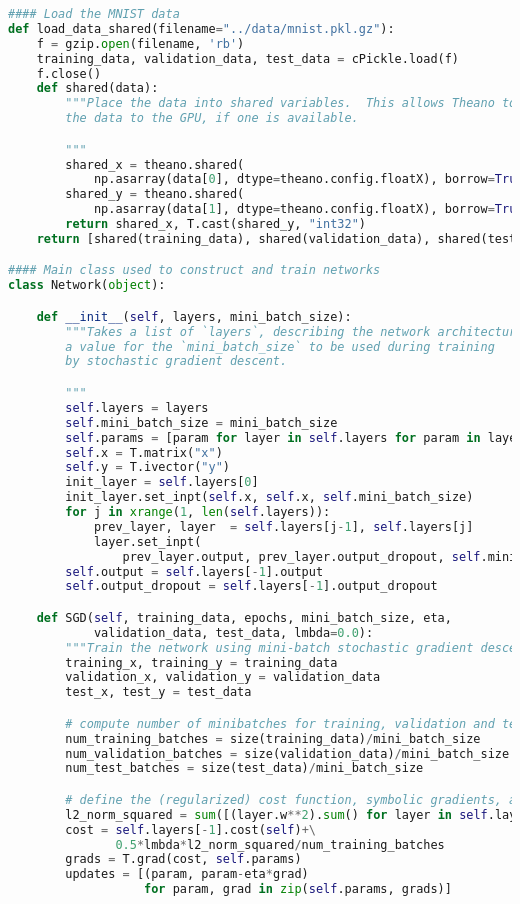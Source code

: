 \begin{fullwidth}
\begin{lstlisting}[caption={network3.py (Python 2.7)},label={lst:network3.py}, language=Python]
#### Load the MNIST data
def load_data_shared(filename="../data/mnist.pkl.gz"):
    f = gzip.open(filename, 'rb')
    training_data, validation_data, test_data = cPickle.load(f)
    f.close()
    def shared(data):
        """Place the data into shared variables.  This allows Theano to copy
        the data to the GPU, if one is available.

        """
        shared_x = theano.shared(
            np.asarray(data[0], dtype=theano.config.floatX), borrow=True)
        shared_y = theano.shared(
            np.asarray(data[1], dtype=theano.config.floatX), borrow=True)
        return shared_x, T.cast(shared_y, "int32")
    return [shared(training_data), shared(validation_data), shared(test_data)]

#### Main class used to construct and train networks
class Network(object):

    def __init__(self, layers, mini_batch_size):
        """Takes a list of `layers`, describing the network architecture, and
        a value for the `mini_batch_size` to be used during training
        by stochastic gradient descent.

        """
        self.layers = layers
        self.mini_batch_size = mini_batch_size
        self.params = [param for layer in self.layers for param in layer.params]
        self.x = T.matrix("x")
        self.y = T.ivector("y")
        init_layer = self.layers[0]
        init_layer.set_inpt(self.x, self.x, self.mini_batch_size)
        for j in xrange(1, len(self.layers)):
            prev_layer, layer  = self.layers[j-1], self.layers[j]
            layer.set_inpt(
                prev_layer.output, prev_layer.output_dropout, self.mini_batch_size)
        self.output = self.layers[-1].output
        self.output_dropout = self.layers[-1].output_dropout

    def SGD(self, training_data, epochs, mini_batch_size, eta,
            validation_data, test_data, lmbda=0.0):
        """Train the network using mini-batch stochastic gradient descent."""
        training_x, training_y = training_data
        validation_x, validation_y = validation_data
        test_x, test_y = test_data

        # compute number of minibatches for training, validation and testing
        num_training_batches = size(training_data)/mini_batch_size
        num_validation_batches = size(validation_data)/mini_batch_size
        num_test_batches = size(test_data)/mini_batch_size

        # define the (regularized) cost function, symbolic gradients, and updates
        l2_norm_squared = sum([(layer.w**2).sum() for layer in self.layers])
        cost = self.layers[-1].cost(self)+\
               0.5*lmbda*l2_norm_squared/num_training_batches
        grads = T.grad(cost, self.params)
        updates = [(param, param-eta*grad)
                   for param, grad in zip(self.params, grads)]


\end{lstlisting}
\end{fullwidth}
